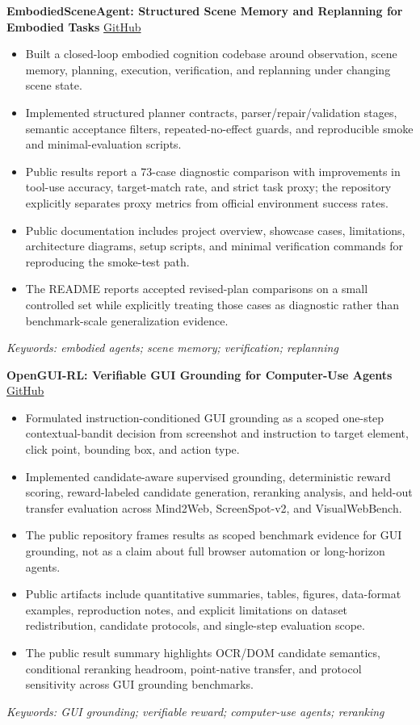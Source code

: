 \documentclass[a4paper,9pt]{extarticle}
\begin{document}
\textbf{EmbodiedSceneAgent: Structured Scene Memory and Replanning for Embodied Tasks}
\hfill \href{https://github.com/checheng117/EmbodiedSceneAgent}{GitHub}\\
\begin{itemize}
  \item Built a closed-loop embodied cognition codebase around observation, scene
  memory, planning, execution, verification, and replanning under changing scene
  state.
  \item Implemented structured planner contracts, parser/repair/validation stages,
  semantic acceptance filters, repeated-no-effect guards, and reproducible smoke
  and minimal-evaluation scripts.
  \item Public results report a 73-case diagnostic comparison with improvements in
  tool-use accuracy, target-match rate, and strict task proxy; the repository
  explicitly separates proxy metrics from official environment success rates.
  \item Public documentation includes project overview, showcase cases, limitations,
  architecture diagrams, setup scripts, and minimal verification commands for
  reproducing the smoke-test path.
  \item The README reports accepted revised-plan comparisons on a small controlled
  set while explicitly treating those cases as diagnostic rather than benchmark-scale
  generalization evidence.
\end{itemize}
\textit{Keywords: embodied agents; scene memory; verification; replanning}
\vspace{0.34\baselineskip}

\textbf{OpenGUI-RL: Verifiable GUI Grounding for Computer-Use Agents}
\hfill \href{https://github.com/checheng117/OpenGUI-RL}{GitHub}\\
\begin{itemize}
  \item Formulated instruction-conditioned GUI grounding as a scoped one-step
  contextual-bandit decision from screenshot and instruction to target element,
  click point, bounding box, and action type.
  \item Implemented candidate-aware supervised grounding, deterministic reward
  scoring, reward-labeled candidate generation, reranking analysis, and held-out
  transfer evaluation across Mind2Web, ScreenSpot-v2, and VisualWebBench.
  \item The public repository frames results as scoped benchmark evidence for GUI
  grounding, not as a claim about full browser automation or long-horizon agents.
  \item Public artifacts include quantitative summaries, tables, figures, data-format
  examples, reproduction notes, and explicit limitations on dataset redistribution,
  candidate protocols, and single-step evaluation scope.
  \item The public result summary highlights OCR/DOM candidate semantics, conditional
  reranking headroom, point-native transfer, and protocol sensitivity across GUI
  grounding benchmarks.
\end{itemize}
\textit{Keywords: GUI grounding; verifiable reward; computer-use agents; reranking}
\vspace{0.34\baselineskip}
\end{document}
